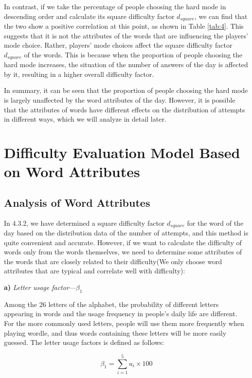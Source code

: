 \documentclass[12pt]{mcmthesis}
\begin{document}
In contrast, if we take the percentage of people choosing the hard mode in descending order and calculate its square difficulty factor $ d_{square} $, we can find that the two show a positive correlation at this point, as shown in Table \ref{tab:4}. This suggests that it is not the attributes of the words that are influencing the players' mode choice. Rather, players' mode choices affect the square difficulty factor $ d_{square} $ of the words. This is because when the proportion of people choosing the hard mode increases, the situation of the number of answers of the day is affected by it, resulting in a higher overall difficulty factor.

In summary, it can be seen that the proportion of people choosing the hard mode is largely unaffected by the word attributes of the day. However, it is possible that the attributes of words have different effects on the distribution of attempts in different ways, which we will analyze in detail later.
\\[0.01pt]
\section{Difficulty Evaluation Model Based on Word Attributes}
\subsection{Analysis of Word Attributes}
\hspace{1.4em}In 4.3.2, we have determined a square difficulty factor $ d_{square} $ for the word of the day based on the distribution data of the number of attempts, and this method is quite convenient and accurate. However, if we want to calculate the difficulty of words only from the words themselves, we need to determine some attributes of the words that are closely related to their difficulty(We only choose word attributes that are typical and correlate well with difficulty):

\textbf{a)} \textit{Letter usage factor}---$ \beta_{1} $

Among the 26 letters of the alphabet, the probability of different letters appearing in words and the usage frequency in people's daily life are different\cite{3}. For the more commonly used letters, people will use them more frequently when playing wordle, and thus words containing these letters will be more easily guessed. The letter usage factors is defined as follows:

\begin{equation}\label{eq:10}
\beta _1=\sum_{i=1}^5{u_i\times 100}
\end{equation}
\end{document}
